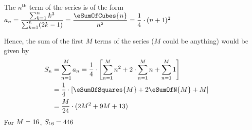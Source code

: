 \begin{solution}
	The $n^{\text{th}}$ term of the series is of the form $a_n = \dfrac{\sum_{k=1}^{n}k^3}{\sum_{k=1}^{n}(2k-1)}
	= \dfrac{\eSumOfCubes{n}}{n^2} = \dfrac{1}{4}\cdot(n+1)^2$
	
	Hence, the sum of the first $M$ terms of the series ($M$ could be anything) would be given by 
	\begin{align}
		S_n &= \sum_{n=1}^{M}a_n = \dfrac{1}{4}\cdot\left[ \sum_{n=1}^{M}n^2 + 2\cdot\sum_{n=1}^{M}n + \sum_{n=1}^{M}1 \right] \\
		&= \dfrac{1}{4}\cdot\left[ \eSumOfSquares{M} + 2\eSumOfN{M} + M \right] \\ 
		&= \dfrac{M}{24}\cdot(2M^2 + 9M + 13)
	\end{align}
	For $M=16$, $S_{16} = 446$
\end{solution}
